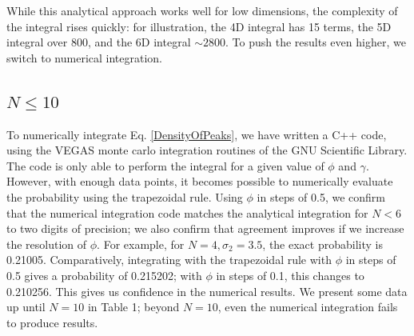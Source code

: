 \documentclass[12pt]{article}
\begin{document}
While this analytical approach works well for low dimensions, the complexity of the integral rises quickly: for illustration, the 4D integral has 15 terms, the 5D integral over 800, and the 6D integral $\sim2800$. To push the results even higher, we switch to numerical integration.

\subsection{$N \leq 10$}
To numerically integrate Eq. \ref{DensityOfPeaks}, we have written a C++ code, using the VEGAS \cite{VEGAS} monte carlo integration routines of the GNU Scientific Library.\cite{GSL} The code is only able to perform the integral for a given value of $\phi$ and $\gamma$. However, with enough data points, it becomes possible to numerically evaluate the probability using the trapezoidal rule. Using $\phi$ in steps of 0.5, we confirm that the numerical integration code matches the analytical integration for $N < 6$ to two digits of precision; we also confirm that agreement improves if we increase the resolution of $\phi$. For example, for $N=4, \sigma_2=3.5$, the exact probability is 0.21005. Comparatively, integrating with the trapezoidal rule with $\phi$ in steps of 0.5 gives a probability of 0.215202; with $\phi$ in steps of 0.1, this changes to 0.210256. This gives us confidence in the numerical results. We present some data up until $N = 10$ in Table 1; beyond $N = 10$, even the numerical integration fails to produce results.
\end{document}
